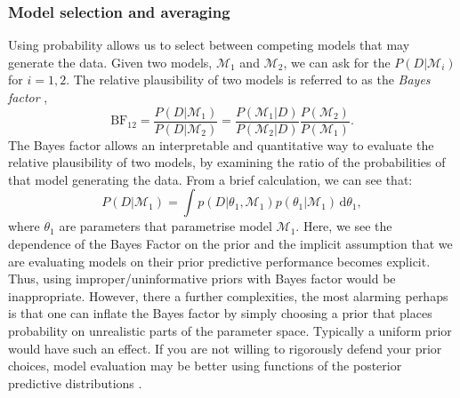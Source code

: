 \documentclass[12pt,english, journal=jpr, layout=twocolumn]{article}
\begin{document}
\subsubsection{Model selection and averaging}
Using probability allows us to select between competing models that may generate the data. Given two models, $\mathcal{M}_1$ and $\mathcal{M}_2$, we can ask for the $P(D| \mathcal{M}_i)$ for $i = 1,2$. The relative plausibility of two models is referred to as the \textit{Bayes factor} \citep{Kass::1995},
\begin{equation}
\text{BF}_{12} = \frac{P(D|\mathcal{M}_1)}{P(D|\mathcal{M}_2)} = \frac{P(\mathcal{M}_1|D)}{P(\mathcal{M}_2|D)}\frac{P(\mathcal{M}_2)}{P(\mathcal{M}_1)}. 
\end{equation}   
The Bayes factor allows an interpretable and quantitative way to evaluate the relative plausibility of two models, by examining the ratio of the probabilities of that model generating the data. From a brief calculation, we can see that:
\begin{equation}
P(D|\mathcal{M}_1) = \int p(D|\theta_1, \mathcal{M}_1)p(\theta_1|\mathcal{M}_1)\, \text{d}\theta_1,
\end{equation}   
where $\theta_1$ are parameters that parametrise model $\mathcal{M}_1$. Here, we see the dependence of the Bayes Factor on the prior and the implicit assumption that we are evaluating models on their prior predictive performance becomes explicit. Thus, using improper/uninformative priors with Bayes factor would be inappropriate. However, there a further complexities, the most alarming perhaps is that one can inflate the Bayes factor by simply choosing a prior that places probability on unrealistic parts of the parameter space. Typically a uniform prior would have such an effect. If you are not willing to rigorously defend your prior choices, model evaluation may be better using functions of the posterior predictive distributions \citep{Betancourt::2021}. 
\end{document}
